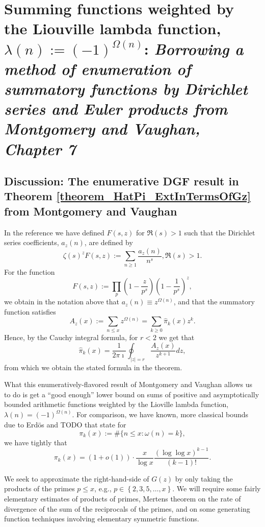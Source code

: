 \documentclass[11pt,reqno,a4letter]{article}
\numberwithin{figure}{section}
\numberwithin{table}{section}
\theoremstyle{plain}
\numberwithin{theorem}{section}
\theoremstyle{definition}
\begin{document}
\section{Summing functions weighted by the Liouville lambda function, $\lambda(n) := (-1)^{\Omega(n)}$: 
         \textit{
         Borrowing a method of enumeration of summatory functions by Dirichlet series and Euler products 
         from Montgomery and Vaughan, Chapter 7} 
        } 
\label{Section_MVCh7_GzBounds} 
        
\subsection{Discussion: The enumerative DGF result in Theorem \ref{theorem_HatPi_ExtInTermsOfGz} from 
            Montgomery and Vaughan} 

In the reference we have defined $F(s, z)$ for $\Re(s) > 1$ such that the 
Dirichlet series coefficients, $a_z(n)$, are defined by 
\[
\zeta(s)^z F(s, z) := \sum_{n \geq 1} \frac{a_z(n)}{n^s}, \Re(s) > 1. 
\]
For the function 
\[
F(s, z) := \prod_p \left(1 - \frac{z}{p^s}\right) \left(1-\frac{1}{p^s}\right)^z, 
\]
we obtain in the notation above that $a_z(n) \equiv z^{\Omega(n)}$, and that the summatory 
function satisfies 
\[
A_z(x) := \sum_{n \leq x} z^{\Omega(n)} = \sum_{k \geq 0} \widehat{\pi}_k(x) z^k. 
\]
Hence, by the Cauchy integral formula, for $r < 2$ we get that 
\[
\widehat{\pi}_k(x) = \frac{1}{2\pi\imath} \oint_{|z|=r} \frac{A_z(x)}{z^{k+1}} dz, 
\]
from which we obtain the stated formula in the theorem. 

What this enumeratively-flavored result of Montgomery and Vaughan allows us to do is get a 
``good enough'' lower bound on sums of positive and asymptotically bounded arithmetic functions 
weighted by the Lioville lambda function, $\lambda(n) = (-1)^{\Omega(n)}$. 
For comparison, we have known, more classical bounds due to Erd\"os and TODO that state for 
\[
\pi_k(x) := \#\{n \leq x: \omega(n) = k\}, 
\]
we have tightly that \cite{TODO,TODO} 
\[
\pi_k(x) = (1 + o(1)) \cdot \frac{x}{\log x} \frac{(\log\log x)^{k-1}}{(k-1)!}. 
\] 

We seek to approximate the right-hand-side of $G(z)$ by only taking the products of the primes 
$p \leq x$, e.g., $p \in \left\{2,3,5,\ldots,x\right\}$. 
We will require some fairly elementary estimates of products of primes, Mertens theorem on the 
rate of divergence of the sum of the reciprocals of the primes, and on some generating function 
techniques involving elementary symmetric functions. 
\end{document}
